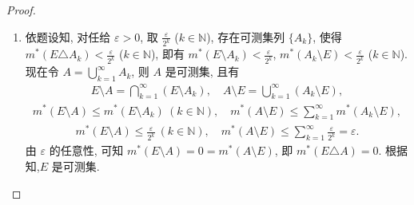 \documentclass[../../main.tex]{subfiles}%
\begin{document}
\begin{proof}
\begin{enumerate}[(1)]
\item 依题设知, 对任给 $\varepsilon>0$, 取 $\frac{\varepsilon}{2^k}$ ($k\in\mathbb{N}$), 存在可测集列 $\{A_k\}$, 使得 $m^*(E\triangle A_k)<\frac{\varepsilon}{2^k}$ ($k\in\mathbb{N}$), 即有 $m^*(E\setminus A_k)<\frac{\varepsilon}{2^k}$, $m^*(A_k\setminus E)<\frac{\varepsilon}{2^k}$ ($k\in\mathbb{N}$). 现在令 $A=\bigcup\limits_{k=1}^{\infty}A_k$, 则 $A$ 是可测集, 且有
\begin{align*}
E\setminus A=\bigcap\limits_{k=1}^{\infty}(E\setminus A_k),\quad A\setminus E=\bigcup\limits_{k=1}^{\infty}(A_k\setminus E),
\end{align*}
\begin{align*}
m^*(E\setminus A)\leqslant m^*(E\setminus A_k)\ (k\in\mathbb{N}),\quad m^*(A\setminus E)\leqslant\sum\limits_{k=1}^{\infty}m^*(A_k\setminus E),
\end{align*}
\begin{align*}
m^*(E\setminus A)\leqslant\frac{\varepsilon}{2^k}\ (k\in\mathbb{N}),\quad m^*(A\setminus E)\leqslant\sum\limits_{k=1}^{\infty}\frac{\varepsilon}{2^k}=\varepsilon.
\end{align*}
由 $\varepsilon$ 的任意性, 可知 $m^*(E\setminus A)=0=m^*(A\setminus E)$, 即 $m^*(E\triangle A)=0$. 根据知,$E$ 是可测集.
\end{enumerate}
\end{proof}
\end{document}
